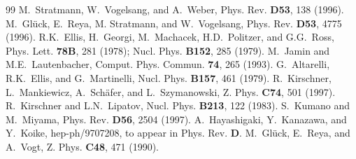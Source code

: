 \begin{thebibliography}{99}
 M.\ Stratmann, W.\ Vogelsang, and A.\ Weber,
Phys. Rev. {\bf D53}, 138 (1996).
 M.\ Gl\"{u}ck, E.\ Reya, M. Stratmann, and W.\ Vogelsang, 
Phys. Rev. {\bf D53}, 4775 (1996).
 R.K.\ Ellis, H.\ Georgi, M.\ Machacek, H.D.\ Politzer, 
and G.G.\ Ross, Phys. Lett. {\bf 78B}, 281 (1978); Nucl. Phys.
{\bf B152}, 285 (1979).
 M.\ Jamin and M.E.\ Lautenbacher, Comput. Phys. Commun.
{\bf 74}, 265 (1993).
 G.\ Altarelli, R.K.\ Ellis, and G.\ Martinelli, 
Nucl. Phys. {\bf B157}, 461 (1979).
 R.\ Kirschner, L.\ Mankiewicz, A.\ Sch\"{a}fer, and
L.\ Szymanowski, Z. Phys. {\bf C74}, 501 (1997).
 R.\ Kirschner and L.N.\ Lipatov, Nucl. Phys. {\bf B213},
122 (1983).
 S.\ Kumano and M.\ Miyama, Phys. Rev. {\bf D56}, 2504 (1997).
 A.\ Hayashigaki, Y.\ Kanazawa, and Y.\ Koike,
hep-ph/9707208, to appear in Phys. Rev. {\bf D}.
 M.\ Gl\"{u}ck, E.\ Reya, and A.\ Vogt, Z. Phys. {\bf C48},
471 (1990).
\end{thebibliography}
 
